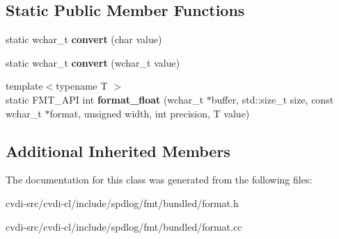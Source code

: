 \subsection*{Static Public Member Functions}
\begin{DoxyCompactItemize}
\item 
static wchar\+\_\+t {\bfseries convert} (char value)\hypertarget{classfmt_1_1internal_1_1CharTraits_3_01wchar__t_01_4_aca94c09c993fa75d2a518d519f6fc177}{}\label{classfmt_1_1internal_1_1CharTraits_3_01wchar__t_01_4_aca94c09c993fa75d2a518d519f6fc177}

\item 
static wchar\+\_\+t {\bfseries convert} (wchar\+\_\+t value)\hypertarget{classfmt_1_1internal_1_1CharTraits_3_01wchar__t_01_4_adbfb38618bd648c3fb4220071d433093}{}\label{classfmt_1_1internal_1_1CharTraits_3_01wchar__t_01_4_adbfb38618bd648c3fb4220071d433093}

\item 
{\footnotesize template$<$typename T $>$ }\\static F\+M\+T\+\_\+\+A\+PI int {\bfseries format\+\_\+float} (wchar\+\_\+t $\ast$buffer, std\+::size\+\_\+t size, const wchar\+\_\+t $\ast$format, unsigned width, int precision, T value)\hypertarget{classfmt_1_1internal_1_1CharTraits_3_01wchar__t_01_4_a72c61dfaffb6965a9e78b28e3f7a3538}{}\label{classfmt_1_1internal_1_1CharTraits_3_01wchar__t_01_4_a72c61dfaffb6965a9e78b28e3f7a3538}

\end{DoxyCompactItemize}
\subsection*{Additional Inherited Members}


The documentation for this class was generated from the following files\+:\begin{DoxyCompactItemize}
\item 
cvdi-\/src/cvdi-\/cl/include/spdlog/fmt/bundled/format.\+h\item 
cvdi-\/src/cvdi-\/cl/include/spdlog/fmt/bundled/format.\+cc\end{DoxyCompactItemize}
